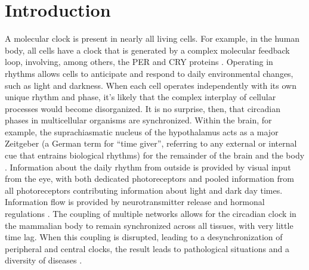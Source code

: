 \documentclass{article}
\newcommand{\added}[1]{{\color{blue}#1}}
\newcommand{\added}[1]{#1}
\begin{document}

\section{Introduction}
A molecular clock is present in nearly all living cells. For example, in the human body, all cells have a clock that is generated by a complex molecular feedback loop, involving, among others, the PER and CRY proteins \cite{takahashi_transcriptional_2017}. Operating in rhythms allows cells to anticipate and respond to daily environmental changes, such as light and darkness. When each cell operates independently with its own unique rhythm and phase, it's likely that the complex interplay of cellular processes would become disorganized. It is no surprise, then, that circadian phases in multicellular organisms are synchronized. Within the brain, for example, the suprachiasmatic nucleus of the hypothalamus acts as a major Zeitgeber \added{(a German term for ``time giver'', referring to any external or internal cue that entrains biological rhythms)} for the remainder of the brain and the body \cite{finger_coupled_2020}. Information about the daily rhythm from outside is provided by visual input from the eye, with both dedicated photoreceptors \cite{berson_phototransduction_2002} and pooled information from all photoreceptors contributing information about light and dark day times. Information flow is provided by neurotransmitter release and hormonal regulations \cite{finger_coupled_2020}. The coupling of multiple networks allows for the circadian clock in the mammalian body to remain synchronized across all tissues, with very little time lag. When this coupling is disrupted, leading to a desynchronization of peripheral and central clocks, the result leads to pathological situations and a diversity of diseases \cite{finger_coupled_2020}.
  
\end{document}
